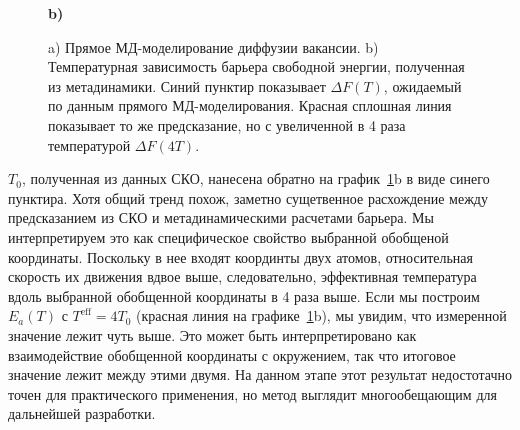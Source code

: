 \documentclass[master,14pt,subf,href,colorlinks=true
]{disser}
\begin{document}
\begin{figure}
\begin{center}
\begin{minipage}{.7\linewidth}
\begin{center}
\textbf{b)}
			\end{center}
		\end{minipage}
	\end{center}

\caption{\label{graph_MSD}a) Прямое МД-моделирование диффузии вакансии. b) Температурная зависимость барьера свободной энергии, полученная из метадинамики. Синий пунктир показывает $\Delta F(T)$, ожидаемый по данным прямого МД-моделирования. Красная сплошная линия показывает то же предсказание, но с увеличенной в 4 раза температурой $\Delta F(4T)$.}
\end{figure}
$T_0$, полученная из данных СКО, нанесена обратно на график~\ref{graph_MSD}b в виде синего пунктира. Хотя общий тренд похож, заметно сущетвенное расхождение между предсказанием из СКО и метадинамическими расчетами барьера.
Мы интерпретируем это как специфическое свойство выбранной обобщеной координаты. Поскольку в нее входят координты двух атомов, относительная скорость их движения вдвое выше, следовательно, эффективная температура вдоль выбранной обобщенной координаты в 4 раза выше. Если мы построим $E_a(T)$ с $T^{\mathrm{ eff}} = 4T_0$ (красная линия на графике~\ref{graph_MSD}b), мы увидим, что измеренной значение лежит чуть выше. Это может быть интерпретировано как взаимодействие обобщенной координаты с окружением, так что итоговое значение лежит между этими двумя. На данном этапе этот результат недостотачно точен для практического применения, но метод выглядит многообещающим для дальнейшей разработки.
\end{document}
